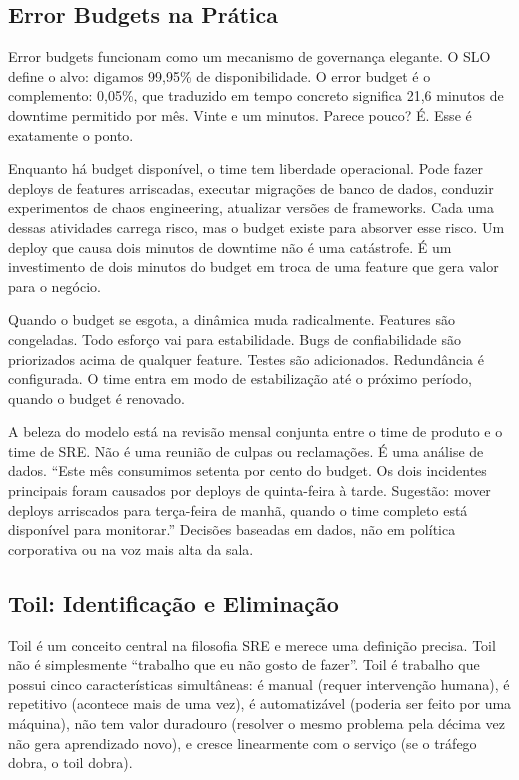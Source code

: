 \subsection{Error Budgets na Prática}

Error budgets funcionam como um mecanismo de governança elegante.
O SLO define o alvo: digamos 99,95\% de disponibilidade. O error budget é o
complemento: 0,05\%, que traduzido em tempo concreto significa 21,6 minutos de
downtime permitido por mês. Vinte e um minutos. Parece pouco? É. Esse é
exatamente o ponto.

Enquanto há budget disponível, o time tem liberdade operacional. Pode fazer
deploys de features arriscadas, executar migrações de banco de dados, conduzir
experimentos de chaos engineering, atualizar versões de frameworks. Cada uma
dessas atividades carrega risco, mas o budget existe para absorver esse risco.
Um deploy que causa dois minutos de downtime não é uma catástrofe. É um
investimento de dois minutos do budget em troca de uma feature que gera valor
para o negócio.

Quando o budget se esgota, a dinâmica muda radicalmente. Features são congeladas.
Todo esforço vai para estabilidade. Bugs de confiabilidade são priorizados acima de
qualquer feature. Testes são adicionados. Redundância é configurada. O time entra
em modo de estabilização até o próximo período, quando o budget é renovado.

A beleza do modelo está na revisão mensal conjunta entre o time de produto e o
time de SRE. Não é uma reunião de culpas ou reclamações. É uma análise de
dados. ``Este mês consumimos setenta por cento do budget. Os dois incidentes
principais foram causados por deploys de quinta-feira à tarde. Sugestão: mover
deploys arriscados para terça-feira de manhã, quando o time completo está
disponível para monitorar.'' Decisões baseadas em dados, não em política
corporativa ou na voz mais alta da sala.

\subsection{Toil: Identificação e Eliminação}

Toil é um conceito central na filosofia SRE e merece uma definição precisa. Toil
não é simplesmente ``trabalho que eu não gosto de fazer''. Toil é trabalho que
possui cinco características simultâneas: é manual (requer intervenção humana), é
repetitivo (acontece mais de uma vez), é automatizável (poderia ser feito por uma
máquina), não tem valor duradouro (resolver o mesmo problema pela décima vez não
gera aprendizado novo), e cresce linearmente com o serviço (se o tráfego dobra,
o toil dobra).

